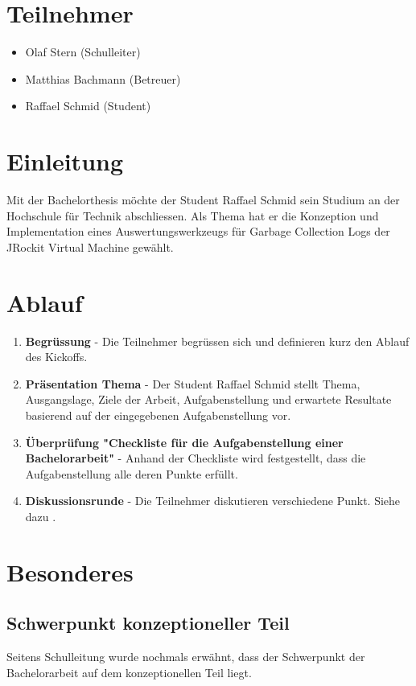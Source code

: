 \section{Teilnehmer}
\begin{itemize}
	\item Olaf Stern (Schulleiter)
	\item Matthias Bachmann (Betreuer)
	\item Raffael Schmid (Student)
\end{itemize}
\section{Einleitung}
Mit der Bachelorthesis möchte der Student Raffael Schmid sein Studium an der Hochschule für Technik abschliessen. Als Thema hat er die Konzeption und Implementation eines Auswertungswerkzeugs für Garbage Collection Logs der JRockit Virtual Machine gewählt. 

\section{Ablauf}
\begin{enumerate} 
\item \textbf{Begrüssung} - Die Teilnehmer begrüssen sich und definieren kurz den Ablauf des Kickoffs.
\item \textbf{Präsentation Thema} - Der Student Raffael Schmid stellt Thema, Ausgangslage, Ziele der Arbeit, Aufgabenstellung und erwartete Resultate basierend auf der eingegebenen Aufgabenstellung vor.
\item \textbf{Überprüfung "Checkliste für die Aufgabenstellung einer Bachelorarbeit"} - Anhand der Checkliste wird festgestellt, dass die Aufgabenstellung alle deren Punkte erfüllt.
\item \textbf{Diskussionsrunde} - Die Teilnehmer diskutieren verschiedene Punkt. Siehe dazu .
\end{enumerate}

\section{Besonderes}\label{besonderes}
\subsection{Schwerpunkt konzeptioneller Teil}
Seitens Schulleitung wurde nochmals erwähnt, dass der Schwerpunkt der Bachelorarbeit auf dem konzeptionellen Teil liegt.
